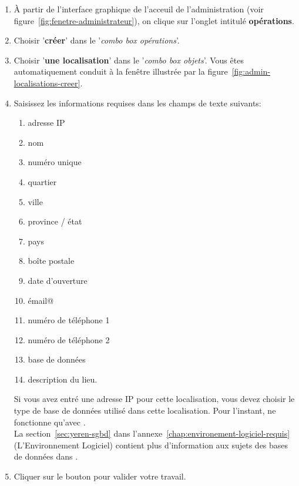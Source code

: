 \begin{enumerate}[1)]
	\item \`A partir de l'interface graphique de l'acceuil de
		l'administration (voir figure~\ref{fig:fenetre-administrateur}),
		on clique sur l'onglet intitul\'e \textbf{op\'erations}. 
		
	\item Choisir '\textbf{cr\'eer}' dans le '\emph{combo box
		op\'erations}'.
		
	\item Choisir '\textbf{une localisation}' dans
		le '\emph{combo box objets}'. Vous \^etes automatiquement
		conduit \`a la fen\^etre illustr\'ee par la
		figure~\ref{fig:admin-localisations-creer}.
		
	\item Saisissez les informations requises dans les champs
		de texte suivants:
		\begin{enumerate}[1)]
			\item adresse IP 
			\item nom \obligatoire
			\item num\'ero unique 
			\item quartier
			\item ville
			\item province / \'etat
			\item pays
			\item bo\^ite postale
			\item date d'ouverture
			\item \'email@
			\item num\'ero de t\'el\'ephone 1
			\item num\'ero de t\'el\'ephone 2	
			\item base de donn\'ees					
			\item description du lieu.\\
		\end{enumerate}
		
		Si vous avez entr\'e une adresse IP pour cette 
		localisation, vous devez choisir le type de base de
		donn\'ees utilis\'e dans cette localisation. Pour
		l'instant, \yeren ne fonctionne qu'avec .\\
		
		La section~\ref{sec:yeren-sgbd} dans
		l'annexe~\ref{chap:environement-logiciel-requis}
		(L'Environnement Logiciel) contient plus d'information
		aux sujets des bases de donn\'ees dans \yeren.
		
	\item Cliquer sur le bouton  pour
		valider votre travail.	
\end{enumerate}


